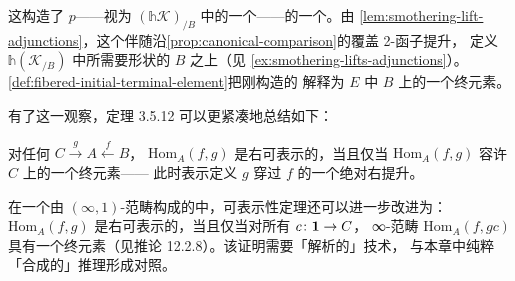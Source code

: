 这构造了 $p$——视为 $(\mathbb{h}\mathcal{K})_{/B}$ 中的一个\trFunctor——的一个\trRightAdjoint。由 %
\cref{lem:smothering-lift-adjunctions}，这个伴随沿\cref{prop:canonical-comparison}的覆盖 2-函子提升，%
定义 $\mathbb{h}(\mathcal{K}_{/B})$ 中所需要形状的 $B$ 之上\trFiberedAdjunction（见 %
\cref{ex:smothering-lifts-adjunctions}）。\cref{def:fibered-initial-terminal-element}把刚构造的 %
\trFiberedAdjunction{}解释为 $E$ 中 $B$ 上的一个终元素。

有了这一观察，定理 3.5.12 可以更紧凑地总结如下：

\begin{corollary}\label{cor:right-representability-terminal-element}
对任何\trCospan{} $C\xrightarrow{\;g\;}A\xleftarrow{\;f\;}B$，\trCommaInfinityCategory{} %
$\mathrm{Hom}_{A}(f,g)$ 是右可表示的，当且仅当 $\mathrm{Hom}_{A}(f,g)$ 容许 $C$ 上的一个终元素——%
此时表示\trFunctor{}定义 $g$ 穿过 $f$ 的一个绝对右提升。
\end{corollary}

\begin{remark}\label{rem:analytic-synthetic}
在一个由 $(\infty,1)$-范畴构成的\trInfinityCosmos{}中，可表示性定理还可以进一步改进为：%
$\mathrm{Hom}_{A}(f,g)$ 是右可表示的，当且仅当对所有\trElement{} $c\colon\mathbf{1}\to C$，%
∞-范畴 $\mathrm{Hom}_{A}(f,gc)$ 具有一个终元素（见推论 12.2.8）。该证明需要「解析的」技术，%
与本章中纯粹「合成的」推理形成对照。
\end{remark}

